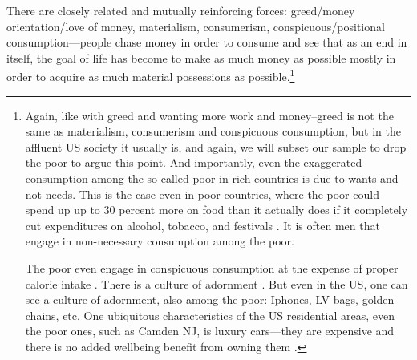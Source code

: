 \documentclass[10pt, letterpaper]{article}
\begin{document}
\begin{spacing}{1.8}
There are closely related and mutually reinforcing forces: greed/money orientation/love of money, materialism, consumerism, conspicuous/positional
consumption---people chase money in order to consume and see that as an end in itself, the goal of life has become to make as much money as possible mostly in
order to acquire as much material possessions as possible.\footnote{Again, like
  with greed and wanting more work and money--greed is not the same as
  materialism, consumerism  and conspicuous consumption, but in the affluent US
  society it usually is, and again, we will subset our sample to drop the poor to argue this point. 
%
And importantly, even the exaggerated consumption among the so called poor in rich countries is due to wants and not needs. This is the case even in poor countries, where the poor could spend up up to 30 percent more on food than it actually does if it completely cut expenditures on alcohol, tobacco, and festivals \citep{banerjee11}.
It is often men that engage in non-necessary consumption among the poor. 

The poor even engage in conspicuous consumption at the expense of proper calorie intake \citep{bellet18}. There is a culture of adornment \citep{cordwell2011fabrics,mascia1992tattoo}. But even in the US, one can see a culture of adornment, also among the poor: Iphones, LV bags, golden chains, etc. %
 One ubiquitous characteristics of the US residential areas, even the poor ones,
 such as Camden NJ, is luxury cars---they are expensive and there is no added    
 wellbeing benefit from owning them \citep{aok_ls_car15}.
}


\end{spacing}
\end{document}

